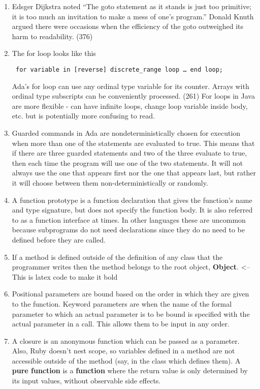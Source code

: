 \begin{answer}
\begin{enumerate}
\item Edsger Dijkstra noted “The goto statement as it stands is just too primitive; it is too much an invitation to make a mess of one’s program.” Donald Knuth argued there were occasions when the efficiency of the goto outweighed its harm to readability. (376)
\item The for loop looks like this
\begin{lstlisting} for variable in [reverse] discrete_range loop … end loop; \end{lstlisting}
Ada’s for loop can use any ordinal type variable for its counter. Arrays with ordinal type subscripts can be conveniently processed. (261) For loops in Java are more flexible - can have infinite loops, change loop variable inside body, etc. but is potentially more confusing to read.
\item Guarded commands in Ada are nondeterministically chosen for execution when more than one of the statements are evaluated to true. This means that if there are three guarded statements and two of the three evaluate to true, then each time the program will use one of the two statements. It will not always use the one that appears first nor the one that appears last, but rather it will choose between them non-deterministically or randomly.
\item  A function prototype is a function declaration that gives the function's name and type signature, but does not specify the function body. It is also referred to as a function interface at times. In other languages these are uncommon because subprograms do not need declarations since they do no need to be defined before they are called. 
\item If a method is defined outside of the definition of any class that the programmer writes then the method belongs to the root object, \textbf{Object}.  <--This is latex code to make it bold
\item Positional parameters are bound based on the order in which they are given to the function. Keyword parameters are when the name of the formal parameter to which an actual parameter is to be bound is specified with the actual parameter in a call. This allows them to be input in any order.
\item A closure is an anonymous function which can be passed as a parameter. Also, Ruby doesn't nest scope, so variables defined in a method are not accessible outside of the method (say, in the class which defines them).
A \textbf{pure function} is a \textbf{function} where the return value is only determined by its input values, without observable side effects.

\end{enumerate}
\end{answer}

